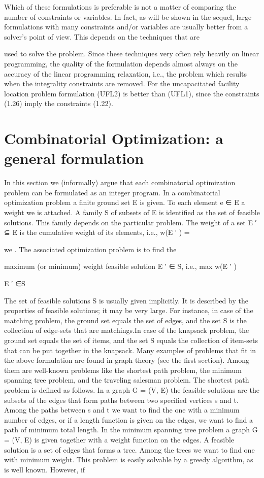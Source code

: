 \documentclass[titlepage]{book}
\begin{document}

Which of these formulations is preferable is not a matter of comparing the number of constraints or
variables. In fact, as will be shown in the sequel, large formulations with many constraints and/or
variables are usually better from a solver's point of view. This depends on the techniques that are

used to solve the problem. Since these techniques very often rely heavily on linear programming, the
quality of the formulation depends almost always on the accuracy of the linear programming relaxation,
i.e., the problem which results when the integrality constraints are removed. For the uncapacitated
facility location problem formulation (UFL2) is better than (UFL1), since the constraints (1.26) imply
the constraints (1.22).

\section{Combinatorial Optimization: a general formulation}

In this section we (informally) argue that each combinatorial optimization problem can be formulated
as an integer program. In a combinatorial optimization problem a finite ground set E is given. To each
element e ∈ E a weight we is attached. A family S of subsets of E is identified as the set of feasible
solutions. This family depends on the particular problem. The weight of a set E ′ ⊆ E is the cumulative
weight of its elements, i.e., w(E ′ ) =


we . The associated optimization problem is to find the

maximum (or minimum) weight feasible solution E ′ ∈ S, i.e.,
max {w(E ′ )}

E ′ ∈S

The set of feasible solutions S is usually given implicitly. It is described by the properties of feasible
solutions; it may be very large. For instance, in case of the matching problem, the ground set equals
the set of edges, and the set S is the collection of edge-sets that are matchings.In case of the knapsack
problem, the ground set equals the set of items, and the set S equals the collection of item-sets that can
be put together in the knapsack.
Many examples of problems that fit in the above formulation are found in graph theory (see the first
section). Among them are well-known problems like the shortest path problem, the minimum spanning
tree problem, and the traveling salesman problem. The shortest path problem is defined as follows. In a
graph G = (V, E) the feasible solutions are the subsets of the edges that form paths between two specified
vertices s and t. Among the paths between s and t we want to find the one with a minimum number of
edges, or if a length function is given on the edges, we want to find a path of minimum total length. In
the minimum spanning tree problem a graph G = (V, E) is given together with a weight function on the
edges. A feasible solution is a set of edges that forms a tree. Among the trees we want to find one with
minimum weight. This problem is easily solvable by a greedy algorithm, as is well known. However, if
\end{document}

